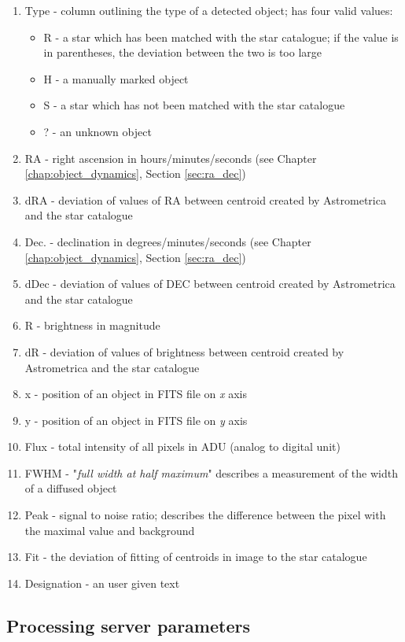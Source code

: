 	\begin{enumerate}
		\item Type - column outlining the type of a detected object; has four valid values:
		\begin{itemize}
			\item R - a star which has been matched with the star catalogue; if the value is in parentheses, the deviation between the two is too large
			\item H - a manually marked object
			\item S - a star which has not been matched with the star catalogue
			\item ? - an unknown object
		\end{itemize}
		\item RA - right ascension in hours/minutes/seconds (see Chapter \ref{chap:object_dynamics}, Section \ref{sec:ra_dec})
		\item dRA - deviation of values of RA between centroid created by Astrometrica and the star catalogue
		\item Dec. - declination in degrees/minutes/seconds (see Chapter \ref{chap:object_dynamics}, Section \ref{sec:ra_dec})
		\item dDec - deviation of values of DEC between centroid created by Astrometrica and the star catalogue
		\item R - brightness in magnitude
		\item dR - deviation of values of brightness between centroid created by Astrometrica and the star catalogue
		\item x - position of an object in FITS file on \emph{x} axis
		\item y - position of an object in FITS file on \emph{y} axis
		\item Flux - total intensity of all pixels in ADU (analog to digital unit)
		\item FWHM - "\emph{full width at half maximum}" describes a measurement of the width of a diffused object
		\item Peak - signal to noise ratio; describes the difference between the pixel with the maximal value and background
		\item Fit - the deviation of fitting of centroids in image to the star catalogue
		\item Designation - an user given text
	\end{enumerate}
	
\subsection{Processing server parameters}\label{sec:server_param}

